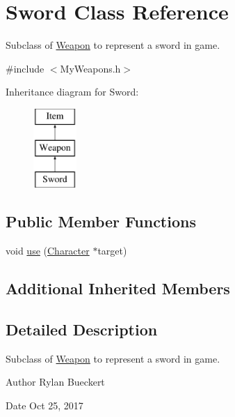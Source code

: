 \hypertarget{classSword}{\section{Sword Class Reference}
\label{classSword}
}


Subclass of \hyperlink{classWeapon}{Weapon} to represent a sword in game.  




{\ttfamily \#include $<$My\-Weapons.\-h$>$}

Inheritance diagram for Sword\-:\begin{figure}[H]
\begin{center}
\leavevmode
\includegraphics[height=3.000000cm]{classSword}
\end{center}
\end{figure}
\subsection*{Public Member Functions}
\begin{DoxyCompactItemize}
\item 
void \hyperlink{classSword_a21231a94ed57dc5fac7cae1c84002e5c}{use} (\hyperlink{classCharacter}{Character} $\ast$target)
\end{DoxyCompactItemize}
\subsection*{Additional Inherited Members}


\subsection{Detailed Description}
Subclass of \hyperlink{classWeapon}{Weapon} to represent a sword in game. 

\begin{DoxyAuthor}{Author}
Rylan Bueckert 
\end{DoxyAuthor}
\begin{DoxyDate}{Date}
Oct 25, 2017 
\end{DoxyDate}


